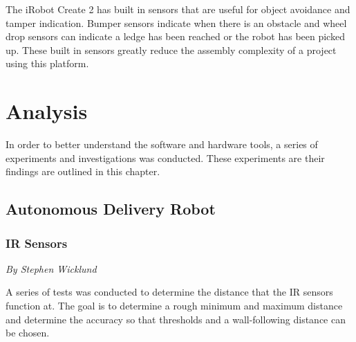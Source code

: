 \documentclass[12pt]{report}
\newcommand{\sectionAuthor}[1]{{\small\vspace{-1em}\textit{#1}}\bigskip\par}
\begin{document}
The iRobot Create 2 has built in sensors that are useful for object avoidance and tamper indication. Bumper sensors indicate when there is an obstacle and wheel drop sensors can indicate a ledge has been reached or the robot has been picked up. These built in sensors greatly reduce the assembly complexity of a project using this platform.

\chapter{Analysis}
In order to better understand the software and hardware tools, a series of experiments and investigations was conducted. These experiments are their findings are outlined in this chapter.
\section{Autonomous Delivery Robot}
\subsection{IR Sensors}
\label{IRSensorTest}
\sectionAuthor{By Stephen Wicklund}
A series of tests was conducted to determine the distance that the IR sensors function at. The goal is to determine a rough minimum and maximum distance and determine the accuracy so that thresholds and a wall-following distance can be chosen.
\end{document}
